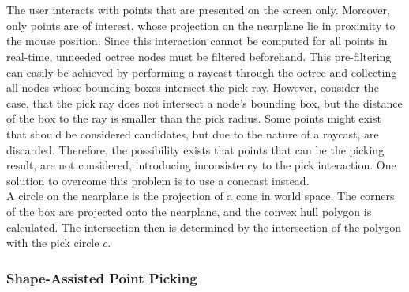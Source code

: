 \\
\\
The user interacts with points that are presented on the screen only. Moreover, only points are of interest, whose projection on the nearplane lie in proximity to the mouse position. Since this interaction cannot be computed for all points in real-time, unneeded octree nodes must be filtered beforehand. This pre-filtering can easily be achieved by performing a raycast through the octree and collecting all nodes whose bounding boxes intersect the pick ray. However, consider the case, that the pick ray does not intersect a node's bounding box, but the distance of the box to the ray is smaller than the pick radius. Some points might exist that should be considered candidates, but due to the nature of a raycast, are discarded. Therefore, the possibility exists that points that can be the picking result, are not considered, introducing inconsistency to the pick interaction. One solution to overcome this problem is to use a conecast instead. 
\\
A circle on the nearplane is the projection of a cone in world space. The corners of the box are projected onto the nearplane, and the convex hull polygon is calculated. The intersection then is determined by the intersection of the polygon with the pick circle $c$. 


\subsubsection{Shape-Assisted Point Picking}
\label {sec:picking_assisted}

